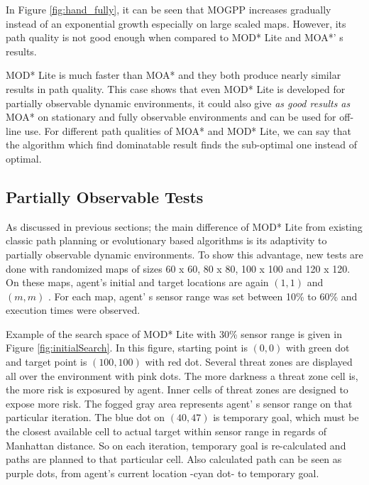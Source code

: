 \documentclass[10pt,journal]{IEEEtran}
\begin{document}
In Figure \ref{fig:hand_fully}, it can be seen that MOGPP increases gradually instead of an exponential growth especially on large scaled maps. However, its path quality is not good enough when compared to MOD* Lite and MOA*' s results.

MOD* Lite is much faster than MOA* and they both produce nearly similar results in path quality. This case shows that even MOD* Lite is developed for partially observable dynamic environments, it could also give \textit{as good results as} MOA* on stationary and fully observable environments and can be used for off-line use. For different path qualities of MOA* and MOD* Lite, we can say that the algorithm which find dominatable result finds the sub-optimal one instead of optimal.

\subsection{Partially Observable Tests}

As discussed in previous sections; the main difference of MOD* Lite from existing classic path planning or evolutionary based algorithms is its adaptivity to partially observable dynamic environments. To show this advantage, new tests are done with randomized maps of sizes 60 x 60, 80 x 80, 100 x 100 and 120 x 120. On these maps, agent's initial and target locations are again $(1, 1)$ and $(m, m)$ . For each map, agent' s sensor range was set between 10\% to 60\% and execution times were observed.

Example of the search space of MOD* Lite with 30\% sensor range is given in Figure \ref{fig:initialSearch}. In this figure, starting point is $(0,0)$ with green dot and target point is $(100,100)$ with red dot. Several threat zones are displayed all over the environment with pink dots. The more darkness a threat zone cell is, the more risk is exposured by agent. Inner cells of threat zones are designed to expose more risk. The fogged gray area represents agent' s sensor range on that particular iteration. The blue dot on $(40,47)$ is temporary goal, which must be the closest available cell to actual target within sensor range in regards of Manhattan distance. So on each iteration, temporary goal is re-calculated and paths are planned to that particular cell. Also calculated path can be seen as purple dots, from agent's current location -cyan dot- to temporary goal.
\end{document}
